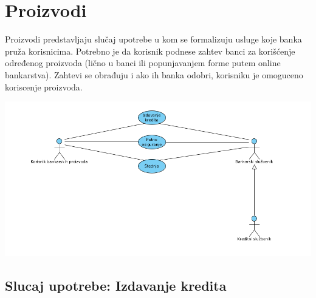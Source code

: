 \documentclass{article}
\begin{document}
\section{Proizvodi}
\label{subsec:proizvodi}

Proizvodi predstavljaju slučaj upotrebe u kom se formalizuju usluge koje banka pruža korisnicima. Potrebno je da korisnik podnese zahtev banci za korišćenje određenog proizvoda (lično u banci ili popunjavanjem forme putem online bankarstva). Zahtevi se obrađuju i ako ih banka odobri, korisniku je omoguceno koriscenje proizvoda.

\includegraphics[scale = 0.4]{./UseCases/Pictures/Bank_products.png}

\subsection{Slucaj upotrebe: Izdavanje kredita}
\label{subsec:kredit}
\end{document}
